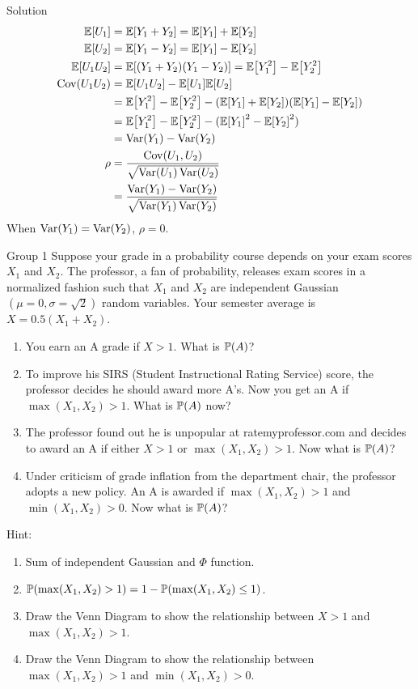 \documentclass{article}
\begin{document}
\begin{solution}
    {Solution}
    \begin{align*}
        \E{U_1} &= \E{Y_1+Y_2} = \E{Y_1}+\E{Y_2} \\
        \E{U_2} &= \E{Y_1-Y_2} = \E{Y_1}-\E{Y_2} \\
        \E{U_1U_2} &= \E{(Y_1+Y_2)(Y_1-Y_2)} = \E{Y_1^2}-\E{Y_2^2} \\
        \Cov(U_1U_2) &= \E{U_1U_2}-\E{U_1}\E{U_2} \\
        & = \E{Y_1^2}-\E{Y_2^2}-(\E{Y_1}+\E{Y_2})(\E{Y_1}-\E{Y_2}) \\
        &= \E{Y_1^2}-\E{Y_2^2}-(\E{Y_1}^2-\E{Y_2}^2) \\
        &= \Var(Y_1)-\Var(Y_2) \\
        \rho &= \frac{\Cov(U_1,U_2)}{\sqrt{\Var(U_1)\Var(U_2)}} \\
        &= \frac{\Var(Y_1)-\Var(Y_2)}{\sqrt{\Var(Y_1)\Var(Y_2)}}
    \end{align*}
    When $\mathop{\mathrm{Var}}\nolimits(Y_1)=\mathop{\mathrm{Var}}\nolimits(Y_2)$, $\rho=0$.
\end{solution}
\fi
\iffalse
\begin{problem}
    {Group 1}
    Suppose your grade in a probability course depends on your exam scores $X_1$ and $X_2$. The professor, a fan of probability, releases exam scores in a normalized fashion such that $X_1$ and $X_2$ are independent Gaussian $(\mu = 0, \sigma=\sqrt{2})$ random variables. Your semester average is $X = 0.5(X_1 + X_2)$.
    \begin{enumerate}
        \item You earn an A grade if $X > 1$. What is $\P{A}$?
        \item To improve his SIRS (Student Instructional Rating Service) score, the professor decides he should award more A's. Now you get an A if $\max(X_1,X_2) > 1$. What is $\P{A}$ now?
        \item The professor found out he is unpopular at ratemyprofessor.com and decides to award an A if either $X >1$ or $\max(X_1,X_2) > 1$. Now what is $\P{A}$?
        \item Under criticism of grade inflation from the department chair, the professor adopts a new policy. An A is awarded if $\max(X_1,X_2) > 1$ and $\min(X_1,X_2) > 0$. Now what is $\P{A}$?
    \end{enumerate}
    \begin{solution}
        {Hint:}
        \begin{enumerate}
            \item Sum of independent Gaussian and $\Phi$ function.
            \item $\P{\max(X_1,X_2)>1}=1-\P{\max(X_1,X_2)\leq 1}$.
            \item Draw the Venn Diagram to show the relationship between $X>1$ and $\max(X_1,X_2) > 1$.
            \item Draw the Venn Diagram to show the relationship between $\max(X_1,X_2) > 1$ and $\min(X_1,X_2) > 0$.
        \end{enumerate}
    \end{solution}
\end{problem}
\end{document}

